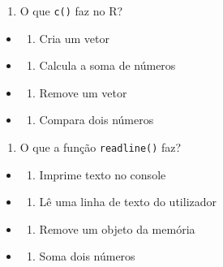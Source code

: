 \documentclass[
]{book}
\providecommand{\tightlist}{%
  \setlength{\itemsep}{0pt}\setlength{\parskip}{0pt}}
\begin{document}
\begin{enumerate}
\def\labelenumi{\arabic{enumi}.}
\setcounter{enumi}{10}
\tightlist
\item
  O que \texttt{c()} faz no R?
\end{enumerate}

\begin{itemize}
\tightlist
\item
  \begin{enumerate}
  \def\labelenumi{\alph{enumi})}
  \tightlist
  \item
    Cria um vetor
  \end{enumerate}
\item
  \begin{enumerate}
  \def\labelenumi{\alph{enumi})}
  \setcounter{enumi}{1}
  \tightlist
  \item
    Calcula a soma de números
  \end{enumerate}
\item
  \begin{enumerate}
  \def\labelenumi{\alph{enumi})}
  \setcounter{enumi}{2}
  \tightlist
  \item
    Remove um vetor
  \end{enumerate}
\item
  \begin{enumerate}
  \def\labelenumi{\alph{enumi})}
  \setcounter{enumi}{3}
  \tightlist
  \item
    Compara dois números
  \end{enumerate}
\end{itemize}

\begin{enumerate}
\def\labelenumi{\arabic{enumi}.}
\setcounter{enumi}{11}
\tightlist
\item
  O que a função \texttt{readline()} faz?
\end{enumerate}

\begin{itemize}
\tightlist
\item
  \begin{enumerate}
  \def\labelenumi{\alph{enumi})}
  \tightlist
  \item
    Imprime texto no console
  \end{enumerate}
\item
  \begin{enumerate}
  \def\labelenumi{\alph{enumi})}
  \setcounter{enumi}{1}
  \tightlist
  \item
    Lê uma linha de texto do utilizador
  \end{enumerate}
\item
  \begin{enumerate}
  \def\labelenumi{\alph{enumi})}
  \setcounter{enumi}{2}
  \tightlist
  \item
    Remove um objeto da memória
  \end{enumerate}
\item
  \begin{enumerate}
  \def\labelenumi{\alph{enumi})}
  \setcounter{enumi}{3}
  \tightlist
  \item
    Soma dois números
  \end{enumerate}
\end{itemize}
\end{document}
